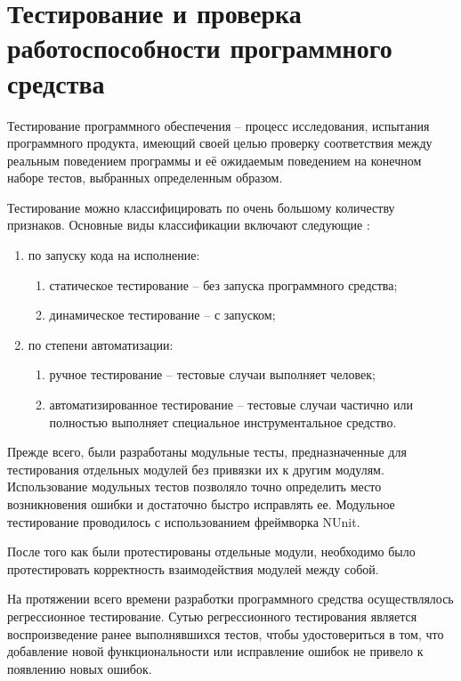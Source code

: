 \section{Тестирование и проверка работоспособности программного средства}
\label{sec:testing}

Тестирование программного обеспечения -- процесс исследования, испытания программного продукта, имеющий своей целью проверку соответствия между реальным поведением программы и её ожидаемым поведением на конечном наборе тестов, выбранных определенным образом.

Тестирование можно классифицировать по очень большому количеству признаков. Основные виды классификации включают следующие \cite{kulikov_testing}:

\begin{enumerate}
	\item по запуску кода на исполнение:
	\begin{enumerate}
		\item статическое тестирование -- без запуска программного средства;
		\item динамическое тестирование -- с запуском;
	\end{enumerate}
	\item по степени автоматизации:
	\begin{enumerate}
		\item ручное тестирование -- тестовые случаи выполняет человек;
		\item автоматизированное тестирование -- тестовые случаи частично или полностью выполняет специальное инструментальное средство.
	\end{enumerate}
\end{enumerate}

Прежде  всего,  были  разработаны  модульные  тесты,  предназначенные для  тестирования  отдельных  модулей  без  привязки  их  к  другим  модулям. Использование модульных тестов позволяло точно определить место возникновения ошибки и достаточно быстро исправлять ее. Модульное тестирование проводилось с использованием фреймворка NUnit. 

После того как были протестированы отдельные модули, необходимо было  протестировать  корректность  взаимодействия  модулей  между  собой. 

На протяжении всего времени разработки программного средства осуществлялось регрессионное тестирование. Сутью регрессионного тестирования является воспроизведение ранее выполнявшихся тестов, чтобы удостовериться  в  том,  что  добавление  новой  функциональности или  исправление ошибок не привело к появлению новых ошибок.


